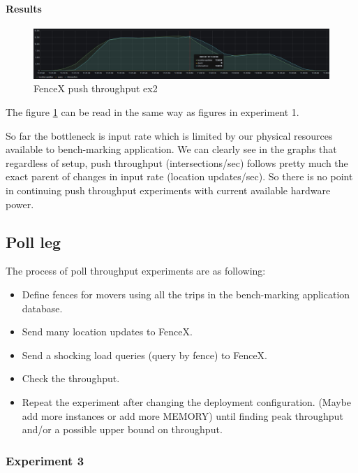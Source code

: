 \documentclass[a4]{report}
\begin{document}
        \paragraph{Results}
        \begin{figure}[ht]
            \caption{FenceX push throughput ex2}
            \label{fig:ex2}
            \includegraphics[scale=0.4]{images/evaluation/ex2-benchmarking(24,10).png}
        \end{figure}
        The figure \ref{fig:ex2} can be read in the same way as figures in experiment 1.

        So far the bottleneck is input rate which is limited by our physical resources available to bench-marking
        application.
        We can clearly see in the graphs that regardless of setup, push throughput (intersections/sec) follows pretty
        much the exact parent of changes in input rate (location updates/sec).
        So there is no point in continuing push throughput experiments with current available hardware power.

        \subsection{Poll leg}
        The process of poll throughput experiments are as following:
        \begin{itemize}
            \item[1-] Define fences for movers using all the trips in the bench-marking application database.
            \item[2-] Send many location updates to FenceX.
            \item[2-] Send a shocking load queries (query by fence) to FenceX.
            \item[3-] Check the throughput.
            \item[4-] Repeat the experiment after changing the deployment configuration. (Maybe add more instances or add
            more MEMORY) until finding peak throughput and/or a possible upper bound on throughput.
        \end{itemize}

        \subsubsection{Experiment 3}
\end{document}

